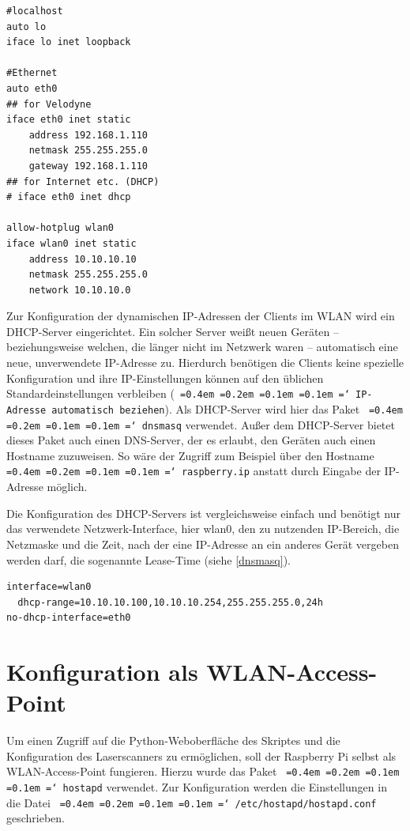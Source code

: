 \documentclass[a4paper,12pt,bibliography=totoc, listof=totoc,titlepage,pointlessnumbers]{scrreprt}
\newcommand*\justify{%
  \fontdimen2\font=0.4em%
  \fontdimen3\font=0.2em%
  \fontdimen4\font=0.1em%
  \fontdimen7\font=0.1em%
  \hyphenchar\font=`\-%
}
\newcommand{\code}[1]{\texttt{\justify{#1}}}
\begin{document}
\begin{lstlisting}[caption={Konfiguration der \code{/etc/network/interfaces}}, label={interfaces}]
#localhost
auto lo
iface lo inet loopback

#Ethernet
auto eth0
## for Velodyne
iface eth0 inet static
	address 192.168.1.110
	netmask 255.255.255.0
	gateway 192.168.1.110
## for Internet etc. (DHCP)
# iface eth0 inet dhcp

allow-hotplug wlan0
iface wlan0 inet static
	address 10.10.10.10
	netmask 255.255.255.0
	network 10.10.10.0
\end{lstlisting}

Zur Konfiguration der dynamischen IP-Adressen der Clients im WLAN wird ein DHCP-Server eingerichtet. Ein solcher Server weißt neuen Geräten -- beziehungsweise welchen, die länger nicht im Netzwerk waren -- automatisch eine neue, unverwendete IP-Adresse zu. Hierdurch benötigen die Clients keine spezielle Konfiguration und ihre IP-Einstellungen können auf den üblichen Standardeinstellungen verbleiben (\code{IP-Adresse automatisch beziehen}). Als DHCP-Server wird hier das Paket \code{dnsmasq} verwendet. Außer dem DHCP-Server bietet dieses Paket auch einen DNS-Server, der es erlaubt, den Geräten auch einen Hostname zuzuweisen. So wäre der Zugriff zum Beispiel über den Hostname \code{raspberry.ip} anstatt durch Eingabe der IP-Adresse möglich.

Die Konfiguration des DHCP-Servers ist vergleichsweise einfach und benötigt nur das verwendete Netzwerk-Interface, hier wlan0, den zu nutzenden IP-Bereich, die Netzmaske und die Zeit, nach der eine IP-Adresse an ein anderes Gerät vergeben werden darf, die sogenannte Lease-Time (siehe \autoref{dnsmasq}). \citep{accesspoint}

  
\begin{lstlisting}[caption={Konfiguration der \code{/etc/dnsmasq.conf}}, label={dnsmasq}]
interface=wlan0
  dhcp-range=10.10.10.100,10.10.10.254,255.255.255.0,24h
no-dhcp-interface=eth0
\end{lstlisting}

\section{Konfiguration als WLAN-Access-Point}
Um einen Zugriff auf die Python-Weboberfläche des Skriptes und die Konfiguration des Laser\-scan\-ners zu ermöglichen, soll der Rasp\-berry Pi selbst als WLAN-Access-Point fungieren. Hierzu wurde das Paket \code{hostapd} verwendet. Zur Konfiguration werden die Einstellungen in die Datei \code{/etc/hostapd/hostapd.conf} geschrieben. \citep{accesspoint}
\end{document}
